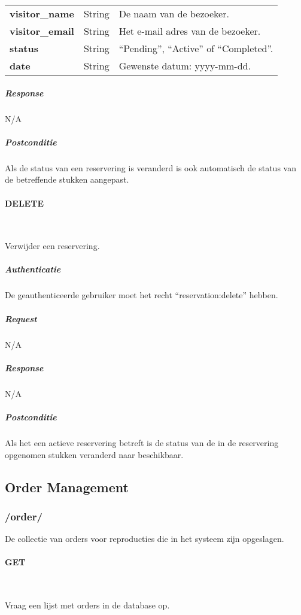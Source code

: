 \documentclass[a4paper,titlepage]{report}
\makeatletter
\def\namedlabel#1#2{
  \label{#1}
  \begingroup
   \def\@currentlabel{#2}%
   \label{#1:name}\endgroup
}
\makeatother
\begin{document}
            \begin{tabular}{ l l p{10cm} }
              \textbf{visitor\_name} & String & De naam van de bezoeker. \\
              \textbf{visitor\_email} & String & Het e-mail adres van de bezoeker. \\
              \textbf{status} & String & ``Pending'', ``Active'' of ``Completed''. \\
              \textbf{date} & String & Gewenste datum: yyyy-mm-dd. \\
            \end{tabular}

          \subparagraph{Response} N/A

          \subparagraph{Postconditie} Als de status van een reservering is
          veranderd is ook automatisch de status van de betreffende stukken
          aangepast.

        \paragraph{DELETE}\hfill\\
          \namedlabel{api:reservation:delete}{DELETE /reservation/[id]}
          Verwijder een reservering.

          \subparagraph{Authenticatie}
            De geauthenticeerde gebruiker moet het recht ``reservation:delete''
            hebben.

          \subparagraph{Request} N/A

          \subparagraph{Response} N/A

          \subparagraph{Postconditie} Als het een actieve reservering betreft
          is de status van de in de reservering opgenomen stukken veranderd
          naar beschikbaar.

    \pagebreak
    \subsection{Order Management}
      \subsubsection{/order/}
        De collectie van orders voor reproducties die in het systeem zijn opgeslagen.

        \paragraph{GET}\hfill\\
          \namedlabel{api:order-list:get}{GET /order/}
          Vraag een lijst met orders in de database op.
\end{document}
